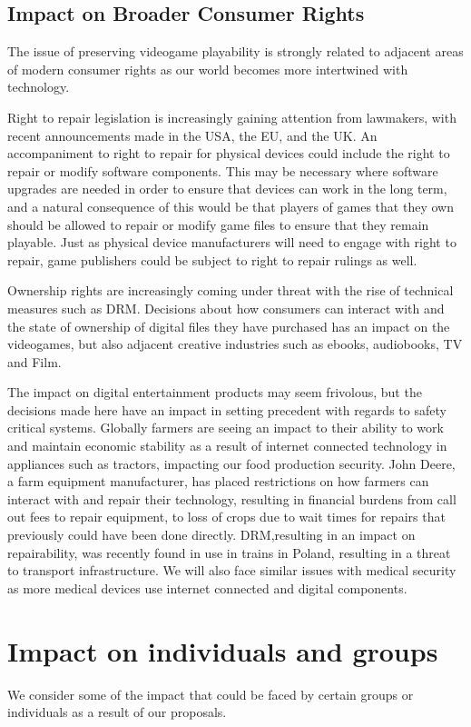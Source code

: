 \subsection{Impact on Broader Consumer Rights}
The issue of preserving videogame playability is strongly related to adjacent areas of modern consumer rights as our world becomes more intertwined with technology.

Right to repair legislation is increasingly gaining attention from lawmakers, with recent announcements made in the USA\cn, the EU\cn, and the UK\cn.
An accompaniment to right to repair for physical devices could include the right to repair or modify software components.
This may be necessary where software upgrades are needed in order to ensure that devices can work in the long term,
and a natural consequence of this would be that players of games that they own should be allowed to repair or modify game files to ensure that they remain playable.
Just as physical device manufacturers will need to engage with right to repair, game publishers could be subject to right to repair rulings as well.

Ownership rights are increasingly coming under threat with the rise of technical measures such as DRM.
Decisions about how consumers can interact with and the state of ownership of  digital files they have purchased has an impact on the videogames,
but also adjacent creative industries such as ebooks, audiobooks, TV and Film.

The impact on digital entertainment products may seem frivolous,
but the decisions made here have an impact in setting precedent with regards to safety critical systems.
Globally farmers are seeing an impact to their ability to work and maintain economic stability as a result of internet connected technology in appliances such as tractors, impacting our food production security.
John Deere, a farm equipment manufacturer, has placed restrictions on how farmers can interact with and repair their technology,
resulting in financial burdens from call out fees to repair equipment\cn, to loss of crops due to wait times for repairs that previously could have been done directly\cn.
DRM,resulting in an impact on repairability, was recently found in use in trains in Poland, resulting in  a threat to transport infrastructure.
We will also face similar issues with medical security as more medical devices use internet connected and digital components\cn.

\section{Impact on individuals and groups}
We consider some of the impact that could be faced by certain groups or individuals as a result of our proposals.

